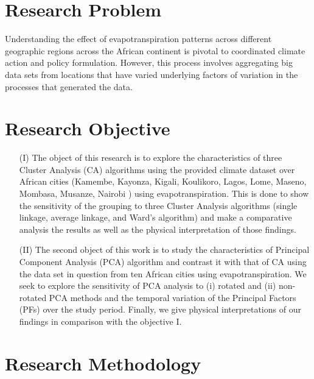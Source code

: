 \documentclass[12pt,a4paper]{article}
\begin{document}
\section{Research Problem}
Understanding the effect of evapotranspiration patterns across different geographic regions across the African continent is pivotal to coordinated climate action and policy formulation. However, this process involves aggregating big data sets from locations that have varied underlying factors of variation in the processes that generated the data. 
\section{Research Objective}
\begin{enumerate}
\item[(I)] The object of this research is to explore the characteristics of three Cluster Analysis (CA) algorithms using the provided climate dataset over African cities (Kamembe, Kayonza, Kigali, Koulikoro, Lagos, Lome, Maseno, Mombasa, Musanze, Nairobi ) using evapotranspiration.  
This is done to show the sensitivity of the grouping to three Cluster Analysis algorithms (single linkage, average linkage,  and Ward’s algorithm) and make a comparative analysis the results as well as the physical interpretation of those findings.
\item[(II)] The second object of this work is to study the characteristics of Principal Component Analysis (PCA) algorithm and contrast it with that of CA using the data set in question from ten African cities using evapotranspiration.  We seek to explore the sensitivity
of PCA analysis to (i) rotated and (ii) non-rotated PCA methods and the temporal variation of the  Principal Factors (PFs) over the study period.  Finally,  we give physical interpretations of our findings in comparison with the objective I.
\end{enumerate}
\section{Research Methodology}
\end{document}
